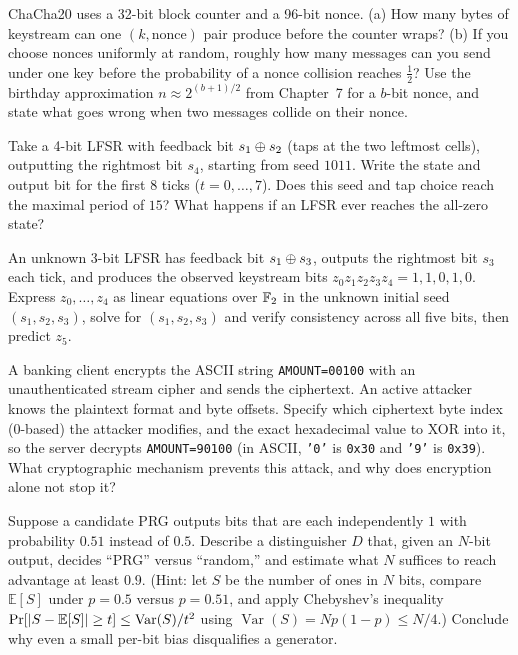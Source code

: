 \begin{exercise}
\label{ch10:ex-nonce-budget}
ChaCha20 uses a 32-bit block counter and a 96-bit nonce. (a) How many bytes of keystream can one $(k, \text{nonce})$ pair produce before the counter wraps? (b) If you choose nonces uniformly at random, roughly how many messages can you send under one key before the probability of a nonce collision reaches $\tfrac12$? Use the birthday approximation $n \approx 2^{(b+1)/2}$ from Chapter~7 for a $b$-bit nonce, and state what goes wrong when two messages collide on their nonce.
\end{exercise}

\begin{exercise}
\label{ch10:ex-lfsr-crank}
Take a 4-bit LFSR with feedback bit $s_1 \oplus s_2$ (taps at the two leftmost cells), outputting the rightmost bit $s_4$, starting from seed $1011$. Write the state and output bit for the first 8 ticks ($t = 0, \dots, 7$). Does this seed and tap choice reach the maximal period of $15$? What happens if an LFSR ever reaches the all-zero state?
\end{exercise}

\begin{exercise}
\label{ch10:ex-lfsr-solve}
An unknown 3-bit LFSR has feedback bit $s_1 \oplus s_3$, outputs the rightmost bit $s_3$ each tick, and produces the observed keystream bits $z_0 z_1 z_2 z_3 z_4 = 1,1,0,1,0$. Express $z_0, \dots, z_4$ as linear equations over $\mathbb{F}_2$ in the unknown initial seed $(s_1,s_2,s_3)$, solve for $(s_1,s_2,s_3)$ and verify consistency across all five bits, then predict $z_5$.
\end{exercise}

\begin{exercise}[Malleability]
\label{ch10:ex-malleability}
A banking client encrypts the ASCII string \texttt{AMOUNT=00100} with an unauthenticated stream cipher and sends the ciphertext. An active attacker knows the plaintext format and byte offsets. Specify which ciphertext byte index (0-based) the attacker modifies, and the exact hexadecimal value to XOR into it, so the server decrypts \texttt{AMOUNT=90100} (in ASCII, \texttt{'0'} is \texttt{0x30} and \texttt{'9'} is \texttt{0x39}). What cryptographic mechanism prevents this attack, and why does encryption alone not stop it?
\end{exercise}

\begin{exercise}
\label{ch10:ex-prg-distinguisher}
Suppose a candidate PRG outputs bits that are each independently $1$ with probability $0.51$ instead of $0.5$. Describe a distinguisher $D$ that, given an $N$-bit output, decides ``PRG'' versus ``random,'' and estimate what $N$ suffices to reach advantage at least $0.9$. (Hint: let $S$ be the number of ones in $N$ bits, compare $\mathbb{E}[S]$ under $p=0.5$ versus $p=0.51$, and apply Chebyshev's inequality $\Pr[\lvert S - \mathbb{E}[S]\rvert \ge t] \le \operatorname{Var}(S)/t^2$ using $\operatorname{Var}(S) = Np(1-p) \le N/4$.) Conclude why even a small per-bit bias disqualifies a generator.
\end{exercise}

